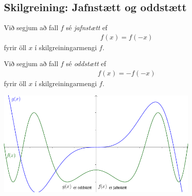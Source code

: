 \documentclass[a4paper,10pt,icelandic]{sphinxmanual}
\begin{document}

\subsection{Skilgreining: Jafnstætt og oddstætt}
\label{kafli01:skilgreining-jafnstaett-og-oddstaett}\label{kafli01:index-10}
Við segjum að fall \(f\) sé \textit{jafnstætt} ef
\begin{equation*}
\begin{split}f(x) = f(-x)\end{split}
\end{equation*}
fyrir öll \(x\) í skilgreiningarmengi \(f\).

Við segjum að fall \(f\) sé \textit{oddstætt} ef
\begin{equation*}
\begin{split}f(x) = -f(-x)\end{split}
\end{equation*}
fyrir öll \(x\) í skilgreiningarmengi \(f\).

\begin{center}
  \includegraphics[width=10cm]{04_JafnstaettOddstaett.png}
\end{center}
\end{document}
